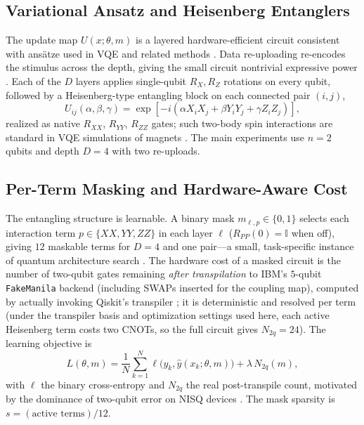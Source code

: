 \documentclass[conference]{IEEEtran}
\begin{document}
\subsection{Variational Ansatz and Heisenberg Entanglers}

The update map $U(x;\theta,m)$ is a layered hardware-efficient circuit consistent with
ans\"atze used in VQE and related methods \cite{b4,b5,b6,b25}. Data re-uploading
re-encodes the stimulus across the depth, giving the small circuit nontrivial expressive
power \cite{b5,b27}. Each of the $D$ layers applies single-qubit $R_X,R_Z$ rotations on
every qubit, followed by a Heisenberg-type entangling block on each connected pair
$(i,j)$,
\begin{equation}
U_{ij}(\alpha,\beta,\gamma) = \exp\!\left[-i\left(\alpha X_iX_j + \beta Y_iY_j + \gamma Z_iZ_j\right)\right],
\end{equation}
realized as native $R_{XX}$, $R_{YY}$, $R_{ZZ}$ gates; such two-body spin interactions are
standard in VQE simulations of magnets \cite{b14,b15}. The main experiments use $n=2$
qubits and depth $D=4$ with two re-uploads.

\subsection{Per-Term Masking and Hardware-Aware Cost}
\label{sec:mask}

The entangling structure is learnable. A binary mask $m_{\ell,p}\in\{0,1\}$ selects each
interaction term $p\in\{XX,YY,ZZ\}$ in each layer $\ell$ ($R_{PP}(0)=\mathbb{I}$ when off),
giving $12$ maskable terms for $D=4$ and one pair---a small, task-specific instance of
quantum architecture search \cite{b16,b17}. The hardware cost of a masked circuit is the
number of two-qubit gates remaining \emph{after transpilation} to IBM's $5$-qubit
\texttt{FakeManila} backend (including SWAPs inserted for the coupling map), computed by
actually invoking Qiskit's transpiler \cite{b24}; it is deterministic and resolved per
term (under the transpiler basis and optimization settings used here, each active
Heisenberg term costs two CNOTs, so the full circuit gives $N_{2q}=24$).
The learning objective is
\begin{equation}
L(\theta,m) = \frac{1}{N}\sum_{k=1}^{N}\ell\big(y_k,\hat y(x_k;\theta,m)\big) + \lambda\, N_{2q}(m),
\label{eq:loss}
\end{equation}
with $\ell$ the binary cross-entropy and $N_{2q}$ the real post-transpile count, motivated
by the dominance of two-qubit error on NISQ devices \cite{b7,b10}. The mask sparsity is
$s=(\text{active terms})/12$.
\end{document}
